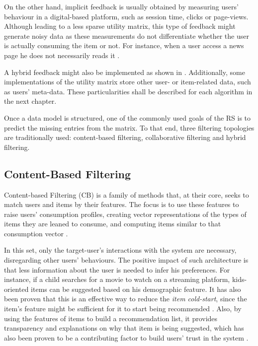     On the other hand, implicit feedback is usually obtained by measuring users' behaviour in a digital-based platform, such as session time, clicks or page-views. Although leading to a less sparse utility matrix, this type of feedback might generate noisy data as these measurements do not differentiate whether the user is actually consuming the item or not. For instance, when a user access a news page he does not necessarily reads it \cite{2008ImplicitFeedback}.
    
    A hybrid feedback might also be implemented as shown in \cite{2015RSPrinciples}. Additionally, some implementations of the utility matrix store other user- or item-related data, such as users' meta-data. These particularities shall be described for each algorithm in the next chapter. 
    
    Once a data model is structured, one of the commonly used goals of the RS is to predict the missing entries from the matrix. To that end, three filtering topologies are traditionally used: content-based filtering, collaborative filtering and hybrid filtering. 

\subsection{Content-Based Filtering}

    Content-based Filtering (CB)  is a family of methods that, at their core, seeks to match users and items by their features. The focus is to use these features to raise users' consumption profiles, creating vector representations of the types of items they are leaned to consume, and computing items similar to that consumption vector \cite{2016Textbook}.
    
    In this set, only the target-user's interactions with the system are necessary, disregarding other users' behaviours. The positive impact of such architecture is that less information about the user is needed to infer his preferences. For instance, if a child searches for a movie to watch on a streaming platform, kids-oriented items can be suggested based on his demographic feature. It has also been proven that this is an effective way to reduce the \textit{item cold-start}, since the item's feature might be sufficient for it to start being recommended \cite{10.1145/564376.564421}. Also, by using the features of items to build a recommendation list, it provides transparency and explanations on why that item is being suggested, which has also been proven to be a contributing factor to build users' trust in the system \cite{10.1145/1111449.1111475}.

